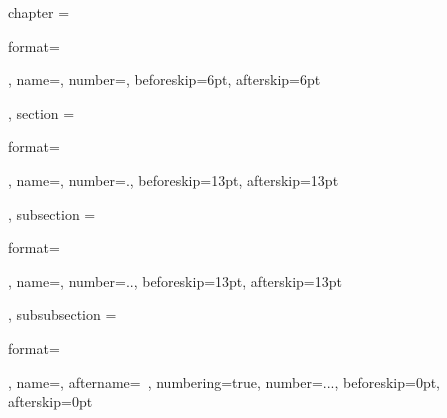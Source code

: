 \ctexset
{
    chapter =
        {
            format=\raggedright{}\heiti,
            name={},
            number=,
            beforeskip=6pt,
            afterskip=6pt
        },
    section =
        {
            format=\raggedright\heiti{},
            name={},
            number=.,
            beforeskip=13pt,
            afterskip=13pt
        },
    subsection =
        {
            format=\raggedright{},
            name={},
            number=..,
            beforeskip=13pt,
            afterskip=13pt
        },
    subsubsection =
        {
            format=\raggedright{},
            name={},
            aftername=~,
            numbering=true,
            number=...,
            beforeskip=0pt,
            afterskip=0pt
        }
}
